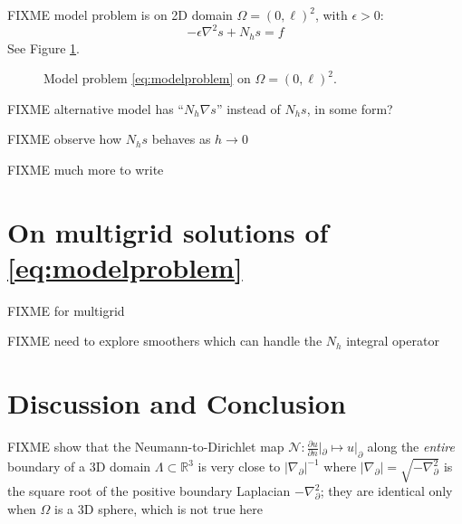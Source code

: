 \documentclass[letterpaper,final,12pt,reqno]{amsart}
\theoremstyle{cstyle}
\theoremstyle{cstyle*}
\theoremstyle{dstyle}
\newcommand{\eps}{\epsilon}
\newcommand{\RR}{\mathbb{R}}
\newcommand{\grad}{\nabla}
\begin{document}
FIXME model problem is on 2D domain $\Omega = (0,\ell)^2$, with $\eps>0$:
\begin{equation}
-\eps \grad^2 s + N_h s = f  \label{eq:modelproblem}
\end{equation}
See Figure \ref{fig:modelproblem}.

\begin{figure}
\caption{Model problem \eqref{eq:modelproblem} on $\Omega = (0,\ell)^2$.}
\label{fig:modelproblem}
\end{figure}

FIXME alternative model has ``$N_h \grad s$'' instead of $N_h s$, in some form?

FIXME observe how $N_h s$ behaves as $h\to 0$

FIXME much more to write

\section{On multigrid solutions of \eqref{eq:modelproblem}} \label{sec:numerical}

FIXME \cite{Briggsetal2000,Bueler2021,Trottenbergetal2001} for multigrid

FIXME need to explore smoothers which can handle the $N_h$ integral operator

\section{Discussion and Conclusion} \label{sec:conclusion}

FIXME \cite{Girouardetal2022} show that the Neumann-to-Dirichlet map $\mathcal{N}:\frac{\partial u}{\partial n}|_{\partial} \mapsto u|_{\partial}$ along the \emph{entire} boundary of a 3D domain $\Lambda \subset \RR^3$ is very close to $|\grad_{\partial}|^{-1}$ where $|\grad_{\partial}| = \sqrt{-\grad_{\partial}^2}$ is the square root of the positive boundary Laplacian $-\grad_{\partial}^2$; they are identical only when $\Omega$ is a 3D sphere, which is not true here





\end{document}
